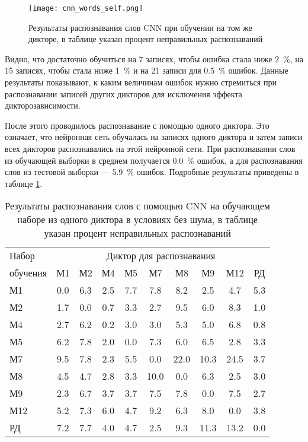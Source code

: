\begin{figure}[h]
	\centering
	\texttt{[image: cnn\_words\_self.png]}
	\caption{Результаты распознавания слов CNN при обучении на том же дикторе, в таблице указан процент неправильных распознаваний}
	\label{fig:cnn_words_self}
\end{figure}

Видно, что достаточно обучиться на 7 записях, чтобы ошибка стала ниже 2~\%, на 15 записях, чтобы стала ниже 1~\% и на 21 записи для 0.5~\% ошибок.
Данные результаты показывают, к каким величинам ошибок нужно стремиться при распознавании записей других дикторов для исключения эффекта дикторозависимости.

После этого проводилось распознавание с помощью одного диктора.
Это означает, что нейронная сеть обучалась на записях одного диктора и затем записи всех дикторов распознавались на этой нейронной сети.
При распознавании слов из обучающей выборки в среднем получается 0.0~\% ошибок, а для распознавания слов из тестовой выборки --- 5.9~\% ошибок.
Подробные результаты приведены в таблице \ref{tab:cnn_1dictor}.

\begin{table}[h]
	\centering
	\caption{Результаты распознавания слов с помощью CNN на обучающем наборе из одного диктора в условиях без шума, в таблице указан процент неправильных распознаваний}
	\label{tab:cnn_1dictor}
	\begin{tabular}{| l | c | c | c | c | c | c | c | c | c |}
		\hline
		Набор & \multicolumn{9}{c|}{Диктор для распознавания} \\
		\hhline{~---------}
		обучения \phantom{00} & \phantom{0}М1\phantom{0} & \phantom{0}М2\phantom{0} & \phantom{0}М4\phantom{0} & \phantom{0}М5\phantom{0} & \phantom{0}М7\phantom{0} & \phantom{0}М8\phantom{0} & \phantom{0}М9\phantom{0} & \phantom{0}М12\phantom{0} & \phantom{0}РД\phantom{0} \\
		\hline
		М1		 & 0.0 & 6.3 & 2.5 & 7.7 &  7.8 &  8.2 &  2.5 &  4.7 & 5.3 \\
		М2		 & 1.7 & 0.0 & 0.7 & 3.3 &  2.7 &  9.5 &  6.0 &  8.3 & 1.0 \\
		М4		 & 2.7 & 6.2 & 0.2 & 3.0 &  3.0 &  5.3 &  5.0 &  6.8 & 0.8 \\
		М5		 & 6.2 & 7.8 & 2.0 & 0.0 &  7.3 &  6.0 &  6.5 &  2.8 & 3.3 \\
		М7		 & 9.5 & 7.8 & 2.3 & 5.5 &  0.0 & 22.0 & 10.3 & 24.5 & 3.7 \\
		М8		 & 4.5 & 4.7 & 2.8 & 3.3 & 10.0 &  0.0 &  6.3 &  2.5 & 3.0 \\
		М9		 & 2.3 & 6.7 & 3.7 & 3.7 &  7.5 &  7.8 &  0.0 &  7.5 & 2.7 \\
		М12		 & 5.2 & 7.3 & 6.0 & 4.7 &  9.2 &  6.3 &  8.0 &  0.0 & 3.8 \\
		РД		 & 7.2 & 7.7 & 4.0 & 4.7 &  2.5 &  9.3 & 11.3 & 13.2 & 0.0 \\
		\hline
	\end{tabular}
\end{table}

